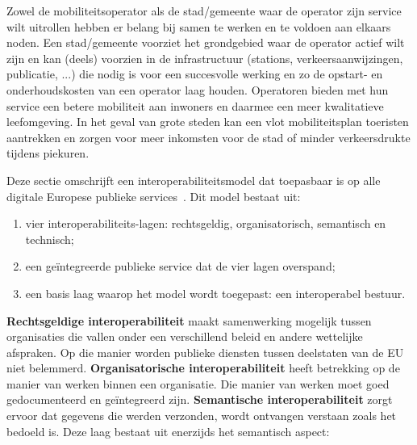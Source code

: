 Zowel de mobiliteitsoperator als de stad/gemeente waar de operator zijn service wilt uitrollen hebben er belang bij samen te werken en te voldoen aan elkaars noden. Een stad/gemeente voorziet het grondgebied waar de operator actief wilt zijn en kan (deels) voorzien in de infrastructuur (stations, verkeersaanwijzingen, publicatie, ...) die nodig is voor een succesvolle werking en zo de opstart- en onderhoudskosten van een operator laag houden. Operatoren bieden met hun service een betere mobiliteit aan inwoners en daarmee een meer kwalitatieve leefomgeving. In het geval van grote steden kan een vlot mobiliteitsplan toeristen aantrekken en zorgen voor meer inkomsten voor de stad of minder verkeersdrukte tijdens piekuren.

Deze sectie omschrijft een interoperabiliteitsmodel dat toepasbaar is op alle digitale Europese publieke services~\cite{neweif}. Dit model bestaat uit:
\begin{enumerate}
  \item vier interoperabiliteits-lagen: rechtsgeldig, organisatorisch, semantisch en technisch;
  \item een geïntegreerde publieke service dat de vier lagen overspand;
  \item een basis laag waarop het model wordt toegepast: een interoperabel bestuur.
\end{enumerate}

\textbf{Rechtsgeldige interoperabiliteit} maakt samenwerking mogelijk tussen organisaties die vallen onder een verschillend beleid en andere wettelijke afspraken. Op die manier worden publieke diensten tussen deelstaten van de EU niet belemmerd. \textbf{Organisatorische interoperabiliteit} heeft betrekking op de manier van werken binnen een organisatie. Die manier van werken moet goed gedocumenteerd en geïntegreerd zijn. \textbf{Semantische interoperabiliteit} zorgt ervoor dat gegevens die werden verzonden, wordt ontvangen verstaan zoals het bedoeld is. Deze laag bestaat uit enerzijds het semantisch aspect: 

